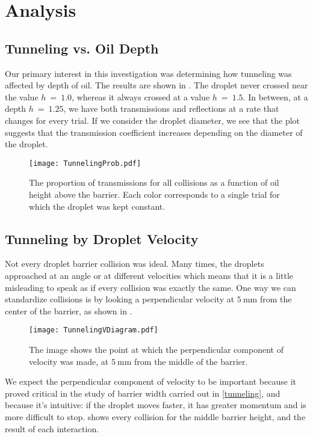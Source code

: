 \section{Analysis}


    \subsection{Tunneling vs. Oil Depth}
Our primary interest in this investigation was determining how tunneling was affected by depth of oil. The results are shown in . The droplet never crossed near the value $h~=~1.0$, whereas it always crossed at a value $h~=~1.5$. In between, at a depth $h~=~1.25$, we have both transmissions and reflections at a rate that changes for every trial. If we consider the droplet diameter, we see that the plot suggests that the transmission coefficient increases depending on the diameter of the droplet.

\begin{figure}[h!]
	\centering
	\texttt{[image: TunnelingProb.pdf]}
	\caption{The proportion of transmissions for all collisions as a function of oil height above the barrier. Each color corresponds to a single trial for which the droplet was kept constant.}
	\label{tbh}
\end{figure}

    \subsection{Tunneling by Droplet Velocity}
Not every droplet barrier collision was ideal. Many times, the droplets approached at an angle or at different velocities which means that it is a little misleading to speak as if every collision was exactly the same. One way we can standardize collisions is by looking a perpendicular velocity at $5~\mathrm{mm}$ from the center of the barrier, as shown in .

\begin{figure}[h!]
	\centering
	\texttt{[image: TunnelingVDiagram.pdf]}
	\caption{The image shows the point at which the perpendicular component of velocity was made, at $5~\mathrm{mm}$ from the middle of the barrier.}
	\label{tvd}
\end{figure}

We expect the perpendicular component of velocity to be important because it proved critical in the study of barrier width carried out in \ref{tunneling}, and because it's intuitive: if the droplet moves faster, it has greater momentum and is more difficult to stop.  shows every collision for the middle barrier height, and the result of each interaction. 

